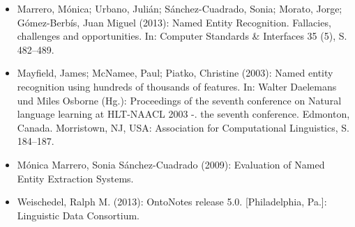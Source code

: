\documentclass{beamer}
\begin{document}
	\begin{frame}
		\begin{itemize}
			\item Marrero, Mónica; Urbano, Julián; Sánchez-Cuadrado, Sonia; Morato, Jorge; Gómez-Berbís, Juan Miguel (2013): Named Entity Recognition. Fallacies, challenges and opportunities. In: Computer Standards \& Interfaces 35 (5), S. 482–489.\\
			\item Mayfield, James; McNamee, Paul; Piatko, Christine (2003): Named entity recognition using hundreds of thousands of features. In: Walter Daelemans und Miles Osborne (Hg.): Proceedings of the seventh conference on Natural language learning at HLT-NAACL 2003 -. the seventh conference. Edmonton, Canada. Morristown, NJ, USA: Association for Computational Linguistics, S. 184–187.\\
			\item Mónica Marrero, Sonia Sánchez-Cuadrado (2009): Evaluation of Named Entity Extraction Systems.\\
			\item Weischedel, Ralph M. (2013): OntoNotes release 5.0. [Philadelphia, Pa.]: Linguistic Data Consortium.\\
		\end{itemize}
	\end{frame}
\end{document}
